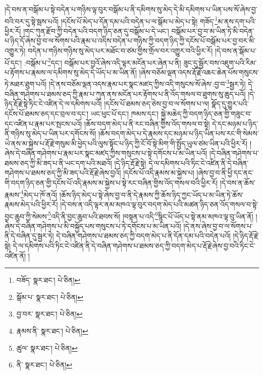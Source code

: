 །དེ་བས་ན་བསྒོམ་པ་སྟེ་བདེན་པ་གཉིས་ལྟ་བུར་བསྒོམ་པ་ནི་དམིགས་སུ་མེད་དེ་མི་དམིགས་པ་ཡིན་པས་སོ་ཞེས་བྱ་བའི་བར་དུ་སྟེ་སྦས་པའོ། །དངོས་པོ་མེད་པ་དོན་དམ་པའི་བདེན་པ་ལ་སྒོམ་པ་མེད་པ་སྟེ། གཟོད་\footnote{བཟོད་  སྣར་ཐང་།  པེ་ཅིན། }མ་ནས་དག་པའི་ཕྱིར་རོ། །གང་ཀུན་རྫོབ་ཀྱི་བདེན་པའི་བདག་ཉིད་ཅན་དུ་བསྒོམ་པ་དེ་ཡང་། བསྒོམ་པར་བྱ་བ་མ་ཡིན་ཏེ་མི་བདེན་པ་ཉིད་དོ་ཞེས་བྱ་བ་ལ་སོགས་པའི་རྣམ་པ་འདིས་བདེན་པ་གཉིས་ཀྱི་བདག་ཉིད་ཀྱི་དངོས་པོ་བསྒོམ་པར་བྱ་བར་མི་འགྱུར་ཏེ། བདེན་པ་གཉིས་གཉིས་སུ་མེད་པར་མཐོང་བ་ཙམ་གྱིས་གྲོལ་བར་འགྱུར་བའི་ཕྱིར་རོ། །དེ་བས་ན་སྒོམ་པ་པོ་དང་། :བསྒོམ་པ་\footnote{སྒོམ་པ་  སྣར་ཐང་།  པེ་ཅིན། }དང་། བསྒོམ་པར་བྱའོ་ཞེས་འདི་ལྟར་མངོན་པར་ཞེན་པ་ནི། ཟུང་དུ་སྦྱོར་བས་འཇུག་པའི་རིམ་པ་རྟོགས་པ་རྣམས་ལ་དམིགས་སུ་མེད་དེ་ཡོད་པ་མ་ཡིན་ནོ། །ཞེས་བཅོམ་ལྡན་འདས་རྡོ་རྗེ་འཆང་ཆེན་པོས་གསུངས་ཏེ་མཐར་ཐུག་པའོ། །དེ་ནས་བཅོམ་ལྡན་འདས་རྣམ་པར་སྣང་མཛད་ཀྱིས་འདི་གསུངས་སོ་ཞེས་:བྱ་བ་\footnote{བྱ་བར་  སྣར་ཐང་།  པེ་ཅིན། }སྦྱར་ཏེ། དེ་བཞིན་གཤེགས་པ་ཐམས་ཅད་ཀྱི་རྣམ་པ་ཀུན་ནས་མངོན་པར་རྟོགས་པ་ནི་འོད་གསལ་བ་ཐུགས་སུ་ཆུད་པའོ། །དེ་ཉིད་རྡོ་རྗེ་སྟེ་ཏིང་ངེ་འཛིན་དེ་ལ་དམིགས་པའོ། །དངོས་པོ་ཐམས་ཅད་ཅེས་བྱ་བ་ལ་སོགས་པ་ལ། སྣོད་དུ་གྱུར་པའི་དངོས་པོ་ཐམས་ཅད་དང་བྲལ་བ་དང་། ཡང་ཕུང་པོ་དང་། ཁམས་དང་། སྐྱེ་མཆེད་ཀྱི་བདག་ཉིད་ཅན་གྱི་གཟུང་བ་དང་འཛིན་པ་རྣམ་པར་སྤངས་པའོ། །ཆོས་བདག་མེད་པ་ནི་རང་བཞིན་གྱིས་འོད་གསལ་བ་སྟེ། དེ་དང་མཉམ་པ་ཉིད་ནི་གཉིས་སུ་མེད་པ་ཡིན་པར་དགོངས་སོ། །ཆོས་བདག་མེད་པ་དེ་རྣམས་དང་མཉམ་པ་ཉིད་ཡིན་པས་རང་གི་སེམས་ཡེ་ནས་མ་སྐྱེས་པ་རྡོ་རྗེ་གསུམ་མི་ཕྱེད་པའི་ལུས་སྟོང་པ་ཉིད་ཀྱི་ངོ་བོ་སྟེ་མིག་གི་སྤྱོད་ཡུལ་ཙམ་ཡིན་པའི་ཕྱིར་རོ། །ཞེས་དེ་བཞིན་གཤེགས་པ་རྣམ་པར་སྣང་མཛད་ཀྱིས་གསུངས་པ་སྟེ་དགོངས་པ་མ་ཡིན་པའོ། །དེ་བཞིན་གཤེགས་པ་ཐམས་ཅད་ཀྱི་མི་ཟད་པ་ནི་ཡང་དག་པའི་མཐའོ། །དེ་ཉིད་རྡོ་རྗེ་སྟེ། དེ་ལ་དམིགས་པའི་ཏིང་ངེ་འཛིན་ནི་དེ་བཞིན་གཤེགས་པ་ཐམས་ཅད་ཀྱི་མི་ཟད་པའི་རྡོ་རྗེ་ཞེས་བྱའོ། །དངོས་པོ་འདི་རྣམས་མ་སྐྱེས་པ། །ཞེས་བྱ་བ་ནི་ཕྱི་དང་ནང་གི་བདག་ཉིད་ཅན་གྱི་དངོས་པོ་འདི་རྣམས་མ་སྐྱེས་པ་སྟེ་རང་བཞིན་གྱིས་འོད་གསལ་བའི་ཕྱིར་རོ། །དེ་བས་ན་ཆོས་རྣམས་\footnote{རྣམས་ནི་  སྣར་ཐང་།  པེ་ཅིན། }མེད་པ་ཁོ་ནའོ། །ཆོས་ཉིད་མེད་པ་སྟེ་ཞེས་བྱ་བ་ནི་དེ་རྣམས་ཀྱི་ཆོས་ཉིད་ཀྱང་ཡོད་པ་མ་ཡིན་ཏེ་ཆོས་རྣམས་མེད་པའི་ཕྱིར་རོ། །དེ་བས་ན་འདི་ལྟར་ནམ་མཁའ་ལྟ་བུར་བདག་མེད་པའི་མཚན་ཉིད་ཅན་འོད་གསལ་བ་སྟེ་བྱང་ཆུབ་ཀྱི་སེམས་\footnote{ཚུལ་  སྣར་ཐང་།  པེ་ཅིན། }འདི་ནི་བྱང་ཆུབ་པའི་ཐབས་སོ། །བསྟན་པ་འདི་\footnote{ནི་  སྣར་ཐང་།  པེ་ཅིན། }སྙིང་པོ་ཡོད་པ་སྟེ་ནམ་མཁའ་ལྟ་བུ་ཡིན་ནོ། །ཞེས་དེ་བཞིན་གཤེགས་པ་མི་བསྐྱོད་པས་གསུངས་པ་ཏེ་དགོངས་པ་མ་ཡིན་པའོ། །དེ་ནས་ཞེས་བྱ་བ་ལ་སོགས་པ་ནི་དེ་བཞིན་དུ་སྦྱར་ཏེ། དེ་བཞིན་གཤེགས་པ་ཐམས་ཅད་ཀྱི་བདག་མེད་པ་ནི་དོན་དམ་པའི་བདེན་པའོ། །དེ་ཉིད་རྡོ་རྗེ་སྟེ། དེ་ལ་དམིགས་པའི་ཏིང་ངེ་འཛིན་ནི་དེ་བཞིན་གཤེགས་པ་ཐམས་ཅད་ཀྱི་བདག་མེད་པ་རྡོ་རྗེ་ཞེས་བྱ་བའི་ཏིང་ངེ་འཛིན་ནོ། །
